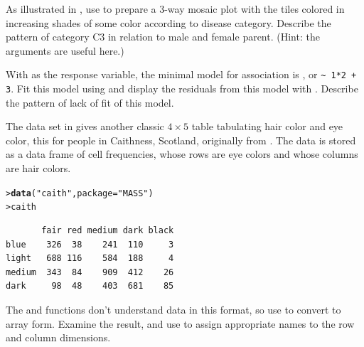 \documentclass[10pt]{report}\usepackage[]{graphicx}\usepackage[]{color}
\makeatletter
\newcommand{\hlstr}[1]{\textcolor[rgb]{0.192,0.494,0.8}{#1}}%
\newcommand{\hlstd}[1]{\textcolor[rgb]{0.345,0.345,0.345}{#1}}%
\newcommand{\hlkwc}[1]{\textcolor[rgb]{0.333,0.667,0.333}{#1}}%
\newcommand{\hlkwd}[1]{\textcolor[rgb]{0.737,0.353,0.396}{\textbf{#1}}}%
\newenvironment{kframe}{%
 \def\at@end@of@kframe{}%
 \ifinner\ifhmode%
  \def\at@end@of@kframe{\end{minipage}}%
  \begin{minipage}{\columnwidth}%
 \fi\fi%
 \def\FrameCommand##1{\hskip\@totalleftmargin \hskip-\fboxsep
 \colorbox{shadecolor}{##1}\hskip-\fboxsep
     \hskip-\linewidth \hskip-\@totalleftmargin \hskip\columnwidth}%
 \MakeFramed {\advance\hsize-\width
   \@totalleftmargin\z@ \linewidth\hsize
   \@setminipage}}%
 {\par\unskip\endMakeFramed%
 \at@end@of@kframe}
\newenvironment{knitrout}{}{} %
\renewenvironment{knitrout}{\small\renewcommand{\baselinestretch}{.85}}{} %
\makeatother
\begin{document}
\begin{Exercises}
\begin{enumerate*}
    \item As illustrated in , use  to prepare a 3-way mosaic
    plot with the tiles colored in increasing shades of some color according to
    disease category.  Describe the pattern of category C3 in relation to male and
    female parent.  (Hint: the  arguments are useful here.)
    \begin{ans}
    \end{ans}
    
    \item With  as the response variable, the minimal model for
    association is , or \verb|~ 1*2 + 3|.
    Fit this model using  and display the residuals from this model
    with . Describe the pattern of lack of fit of this model.
    \begin{ans}
    \end{ans}
    
  \end{enumerate*}

  \exercise The data set  in  gives another
  classic $4 \times 5$ table 
  tabulating hair color and eye color, this for  
  people in Caithness, Scotland, originally from
  \citet{Fisher:1940}.  The data is stored as a data frame of cell frequencies, whose rows are eye colors
  and whose columns are hair colors.
\begin{knitrout}\footnotesize
{}\color{fgcolor}\begin{kframe}
\begin{alltt}
\hlstd{> }\hlkwd{data}\hlstd{(}\hlstr{"caith"}\hlstd{,} \hlkwc{package} \hlstd{=} \hlstr{"MASS"}\hlstd{)}
\hlstd{> }\hlstd{caith}
\end{alltt}
\begin{verbatim}
       fair red medium dark black
blue    326  38    241  110     3
light   688 116    584  188     4
medium  343  84    909  412    26
dark     98  48    403  681    85
\end{verbatim}
\end{kframe}
\end{knitrout}

  \begin{enumerate*}
    \item The  and  functions don't understand data in this format, 
    so use  
    to convert to array form.  Examine the result, and use \newline{} to %
    assign appropriate names to the row and column dimensions.
    \begin{ans}
    \end{ans}
    

\end{enumerate*}
\end{Exercises}
\end{document}
